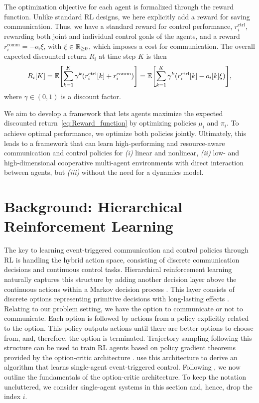 \documentclass[12pt, final]{l4dc2023}
\begin{document}
The optimization objective for each agent is formalized through the reward function.
Unlike standard RL designs, we here explicitly add a reward for saving communication.
Thus, we have a standard reward for control performance, $r^\mathrm{ctrl}_i$, rewarding both joint and individual control goals of the agents, and a reward $r^\mathrm{comm}_i=-o_i\xi$, with $\xi\in\operatorname*{\mathbb{R}}_{\ge0}$, which imposes a cost for communication.
The overall expected discounted return $R_i$ at time step $K$ is then
    \begin{equation}
    R_i[K] = \E\left[\sum\limits_{k=1}^K \gamma^k (r^\mathrm{ctrl}_i\left[k\right] + r_i^\mathrm{comm})\right] = \E\left[\sum\limits_{k=1}^K \gamma^k (r^\mathrm{ctrl}_i\left[k\right]-o_i\left[k\right]\xi)\right]
    \label{eq:Reward_function},
    \end{equation}
where $\gamma\in(0,1)$ is a discount factor.

We aim to develop a framework that lets agents maximize the expected discounted return~\eqref{eq:Reward_function} by optimizing policies $\mu_i$ and $\pi_i$.
To achieve optimal performance, we optimize both policies jointly. 
Ultimately, this leads to a framework that can learn high-performing and resource-aware communication and control policies for \emph{(i)} linear and nonlinear, \emph{(ii)} low- and high-dimensional cooperative multi-agent environments with direct interaction between agents, but \emph{(iii)} without the need for a dynamics model.


\section{Background: Hierarchical Reinforcement Learning}
The key to learning event-triggered communication and control policies through RL is handling the hybrid action space, consisting of discrete communication decisions and continuous control tasks. Hierarchical reinforcement learning naturally captures this structure by adding another decision layer above the continuous actions within a Markov decision process \citep{sutton1999between}. This layer consists of discrete options representing primitive decisions with long-lasting effects \citep{Precup.2000}. 
Relating to our problem setting, we have the option to communicate or not to communicate.
Each option is followed by actions from a policy explicitly related to the option. This policy outputs actions until there are better options to choose from, and, therefore, the option is terminated. Trajectory sampling following this structure can be used to train RL agents based on policy gradient theorems provided by the option-critic architecture \citep{Bacon.16.09.2016}. \cite{funk2021learning} use this architecture to derive an algorithm that learns single-agent event-triggered control. Following \cite{funk2021learning}, we now outline the fundamentals of the option-critic architecture.
To keep the notation uncluttered, we consider single-agent systems in this section and, hence, drop the index $i$.
\end{document}
